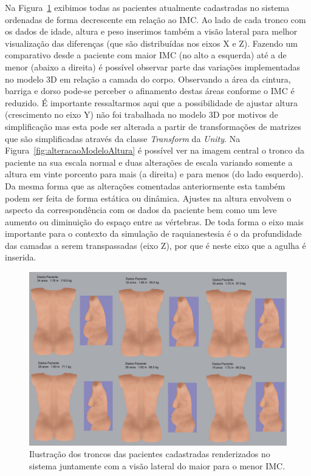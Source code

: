Na Figura~\ref{fig:pacientesMaiorParaMenorIMCVisaoTroncoELateral} exibimos todas as pacientes atualmente cadastradas no sistema ordenadas de forma decrescente em relação ao \acrshort{IMC}. Ao lado de cada tronco com os dados de idade, altura e peso inserimos também a visão lateral para melhor visualização das diferenças (que são distribuídas nos eixos X e Z). Fazendo um comparativo desde a paciente com maior \acrshort{IMC} (no alto a esquerda) até a de menor (abaixo a direita) é possível observar parte das variações implementadas no modelo 3D em relação a camada do corpo. Observando a área da cintura, barriga e dorso pode-se perceber o afinamento destas áreas conforme o \acrshort{IMC} é reduzido. É importante ressaltarmos aqui que a possibilidade de ajustar altura (crescimento no eixo Y) não foi trabalhada no modelo 3D por motivos de simplificação mas esta pode ser alterada a partir de transformações de matrizes que são simplificadas através da classe \textit{Transform} da \textit{Unity}. Na Figura~\ref{fig:alteracaoModeloAltura} é possível ver na imagem central o tronco da paciente na sua escala normal e duas alterações de escala variando somente a altura em vinte porcento para mais (a direita) e para menos (do lado esquerdo). Da mesma forma que as alterações comentadas anteriormente esta também podem ser feita de forma estática ou dinâmica. Ajustes na altura envolvem o aspecto da correspondência com os dados da paciente bem como um leve aumento ou diminuição do espaço entre as vértebras. De toda forma o eixo mais importante para o contexto da simulação de raquianestesia é o da profundidade das camadas a serem transpassadas (eixo Z), por que é neste eixo que a agulha é inserida.

\begin{figure}[ht!]
    \centering
    \includegraphics[width=0.9\linewidth]{capitulos/figuras/pacientes cadastradas maior para menor imc visao tronco sentado e lateral.png} 
    \caption{Ilustração dos troncos das pacientes cadastradas renderizados no sistema juntamente com a visão lateral do maior para o menor IMC.}
    \label{fig:pacientesMaiorParaMenorIMCVisaoTroncoELateral}
\end{figure}

